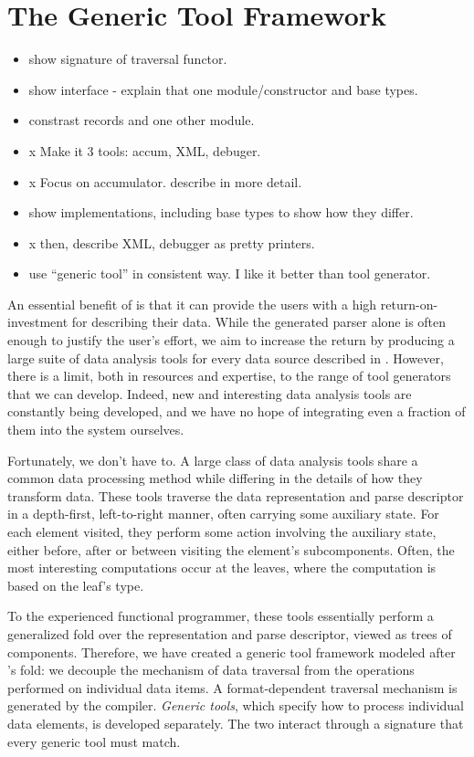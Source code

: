 \section{The Generic Tool Framework}
\label{sec:gen-tool}

\begin{itemize}
\item show signature of traversal functor.
\item show interface - explain that one module/constructor and base types.
\item constrast records and one other module.
\item x Make it 3 tools: accum, XML, debuger.
\item x Focus on accumulator. describe in more detail.
\item show implementations,  including base types to show how they differ.
\item x then, describe XML, debugger as pretty printers.
\item use ``generic tool'' in consistent way. I like it better than
  tool generator.
\end{itemize}

An essential benefit of \padsml{} is that it can provide the users
with a high return-on-investment for describing their data. While the
generated parser alone is often enough to justify the user's effort,
we aim to increase the return by producing a large suite of data
analysis tools for every data source described in \padsml{}. However,
there is a limit, both in resources and expertise, to the range of
tool generators that we can develop. Indeed, new and interesting data
analysis tools are constantly being developed, and we have no hope of
integrating even a fraction of them into the \padsml{} system
ourselves.

Fortunately, we don't have to. A large class of data analysis tools
share a common data processing method while differing in the details
of how they transform data. These tools traverse the data
representation and parse descriptor in a depth-first, left-to-right
manner, often carrying some auxiliary state.  For each element
visited, they perform some action involving the auxiliary state,
either before, after or between visiting the element's subcomponents.
Often, the most interesting computations occur at the leaves, where
the computation is based on the leaf's type.  

To the experienced functional programmer, these tools essentially
perform a generalized fold over the representation and parse
descriptor, viewed as trees of components. Therefore, we have created
a generic tool framework modeled after \ml{}'s fold: we decouple the
mechanism of data traversal from the operations performed on
individual data items. A format-dependent traversal mechanism is
generated by the \padsml{} compiler. \emph{Generic tools}, which
specify how to process individual data elements, is developed
separately. The two interact through a signature that every generic
tool must match.

